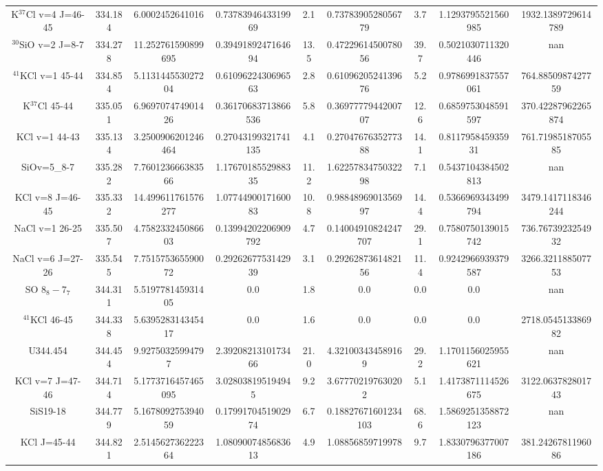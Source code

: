 \begin{table*}[htp]
\begin{tabular}{ccccccccc}
K$^{37}$Cl v=4 J=46-45 & 334.184 & 6.0002452641016 & 0.7378394643319969 & 2.1 & 0.7378390528056779 & 3.7 & 1.1293795521560985 & 1932.1389729614789 \\
$^{30}$SiO v=2 J=8-7 & 334.278 & 11.252761590899695 & 0.3949189247164694 & 13.5 & 0.4722961450078056 & 39.7 & 0.5021030711320446 & nan \\
$^{41}$KCl v=1 45-44 & 334.854 & 5.113144553027204 & 0.6109622430696563 & 2.8 & 0.6109620524139676 & 5.2 & 0.9786991837557061 & 764.8850987427759 \\
K$^{37}$Cl 45-44 & 335.051 & 6.969707474901426 & 0.36170683713866536 & 5.8 & 0.3697777944200707 & 12.6 & 0.6859753048591597 & 370.42287962265874 \\
KCl v=1 44-43 & 335.134 & 3.2500906201246464 & 0.27043199321741135 & 4.1 & 0.2704767635277388 & 14.1 & 0.811795845935931 & 761.7198518705585 \\
SiOv=5_8-7 & 335.282 & 7.760123666383566 & 1.1767018552988335 & 11.2 & 1.6225783475032298 & 7.1 & 0.5437104384502813 & nan \\
KCl v=8 J=46-45 & 335.332 & 14.499611761576277 & 1.0774490017160083 & 10.8 & 0.9884896901356997 & 14.4 & 0.5366969343499794 & 3479.1417118346244 \\
NaCl v=1 26-25 & 335.507 & 4.758233245086603 & 0.13994202206909792 & 4.7 & 0.14004910824247707 & 29.1 & 0.7580750139015742 & 736.7673923254932 \\
NaCl v=6 J=27-26 & 335.545 & 7.751575365590072 & 0.2926267753142939 & 3.1 & 0.2926287361482156 & 11.4 & 0.9242966939379587 & 3266.321188507753 \\
SO $8_8-7_7$ & 344.311 & 5.519778145931405 & 0.0 & 1.8 & 0.0 & 0.0 & 0.0 & nan \\
$^{41}$KCl 46-45 & 344.338 & 5.639528314345417 & 0.0 & 1.6 & 0.0 & 0.0 & 0.0 & 2718.054513386982 \\
U344.454 & 344.454 & 9.92750325994797 & 2.3920821310173466 & 21.0 & 4.321003434589169 & 29.2 & 1.1701156025955621 & nan \\
KCl v=7 J=47-46 & 344.714 & 5.1773716457465095 & 3.028038195194945 & 9.2 & 3.677702197630202 & 5.1 & 1.4173871114526675 & 3122.063782801743 \\
SiS19-18 & 344.779 & 5.167809275394059 & 0.1799170451902974 & 6.7 & 0.18827671601234103 & 68.6 & 1.5869251358872123 & nan \\
KCl J=45-44 & 344.821 & 2.514562736222364 & 1.0809007485683613 & 4.9 & 1.08856859719978 & 9.7 & 1.8330796377007186 & 381.2426781196086 \\

\end{tabular}
\end{table*}
